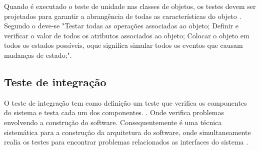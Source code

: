     Quando é executado o teste de unidade nas classes de objetos, os testes devem ser projetados para garantir a abrangência de todas as características do objeto \cite{EngSofSommerville}. Segundo o \cite{EngSofSommerville} deve-se "Testar todas as operações associadas ao objeto; Definir e verificar o valor de todos os atributos associados ao objeto; Colocar o objeto em todos os estados possíveis, oque significa simular todos os eventos que causam mudanças de estado;".
    
    
    
    
    


\subsection{Teste de integração}
\label{sec:Teste de integração}
	O teste de integração tem como definição um teste que verifica os componentes do sistema e testa cada um dos componentes. \cite{EngdeSoftwareFMP}. Onde verifica problemas envolvendo a construção do software. Consequentemente é uma técnica sistemática para a construção da arquitetura do software, onde simultaneamente realia os testes para encontrar problemas relacionados as interfaces do sistema \cite{pressman}.
    
